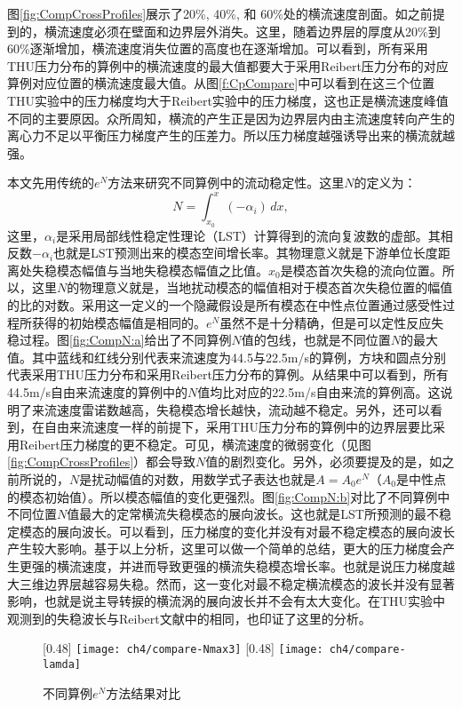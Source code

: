 图\ref{fig:CompCrossProfiles}展示了20\%, 40\%, 和 60\%处的横流速度剖面。如之前提到的，横流速度必须在壁面和边界层外消失。这里，随着边界层的厚度从20\%到60\%逐渐增加，横流速度消失位置的高度也在逐渐增加。可以看到，所有采用THU压力分布的算例中的横流速度的最大值都要大于采用Reibert压力分布的对应算例对应位置的横流速度最大值。从图\ref{f:CpCompare}中可以看到在这三个位置THU实验中的压力梯度均大于Reibert实验中的压力梯度，这也正是横流速度峰值不同的主要原因。众所周知，横流的产生正是因为边界层内由主流速度转向产生的离心力不足以平衡压力梯度产生的压差力。所以压力梯度越强诱导出来的横流就越强。

本文先用传统的$e^N$方法来研究不同算例中的流动稳定性。这里$N$的定义为：
\begin{equation}\label{e:eNdef}
  N=\int_{x_0}^x( -\alpha_i)\,dx,
\end{equation}
这里，$\alpha_i$是采用局部线性稳定性理论（LST）计算得到的流向复波数的虚部。其相反数$-\alpha_i$也就是LST预测出来的模态空间增长率。其物理意义就是下游单位长度距离处失稳模态幅值与当地失稳模态幅值之比值。$x_0$是模态首次失稳的流向位置。所以，这里$N$的物理意义就是，当地扰动模态的幅值相对于模态首次失稳位置的幅值的比的对数。采用这一定义的一个隐藏假设是所有模态在中性点位置通过感受性过程所获得的初始模态幅值是相同的。$e^N$虽然不是十分精确，但是可以定性反应失稳过程。图\ref{fig:CompN:a}给出了不同算例$N$值的包线，也就是不同位置$N$的最大值。其中蓝线和红线分别代表来流速度为44.5与22.5m/s的算例，方块和圆点分别代表采用THU压力分布和采用Reibert压力分布的算例。从结果中可以看到，所有44.5m/s自由来流速度的算例中的$N$值均比对应的22.5m/s自由来流的算例高。这说明了来流速度雷诺数越高，失稳模态增长越快，流动越不稳定。另外，还可以看到，在自由来流速度一样的前提下，采用THU压力分布的算例中的边界层要比采用Reibert压力梯度的更不稳定。可见，横流速度的微弱变化（见图\ref{fig:CompCrossProfiles}）都会导致$N$值的剧烈变化。另外，必须要提及的是，如之前所说的，$N$是扰动幅值的对数，用数学式子表达也就是$A=A_0e^{N}$（$A_0$是中性点的模态初始值）。所以模态幅值的变化更强烈。图\ref{fig:CompN:b}对比了不同算例中不同位置$N$值最大的定常横流失稳模态的展向波长。这也就是LST所预测的最不稳定模态的展向波长。可以看到，压力梯度的变化并没有对最不稳定模态的展向波长产生较大影响。基于以上分析，这里可以做一个简单的总结，更大的压力梯度会产生更强的横流速度，并进而导致更强的横流失稳模态增长率。也就是说压力梯度越大三维边界层越容易失稳。然而，这一变化对最不稳定横流模态的波长并没有显著影响，也就是说主导转捩的横流涡的展向波长并不会有太大变化。在THU实验中观测到的失稳波长与Reibert文献中的相同，也印证了这里的分析。
\begin{figure}
\centering
{} [0.48\linewidth]%
{\texttt{[image: ch4/compare-Nmax3]}}
 [0.48\linewidth] %
{\texttt{[image: ch4/compare-lamda]}}
\caption{不同算例$e^{N}$方法结果对比}
\label{fig:CompN} %
\end{figure}

